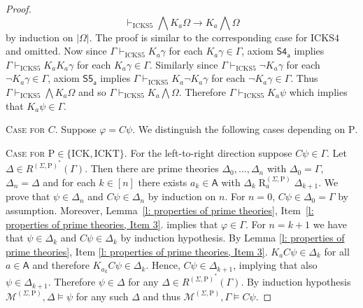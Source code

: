 \documentclass{myifcolog}
\newcommand\C {C}
\newcommand{\K}{K}
\newcommand\A{\mathsf{A}}
\newcommand{\agi}{a}
\newcommand{\fw}{\mathcal{M}}
\newcommand{\Rel}{\mathrel{R}}
\newcommand{\hick}{\mathrm{ICK}}
\newcommand{\hickt}{\mathrm{ICKT}}
\newcommand{\hicks}{\mathrm{ICKS4}}
\newcommand{\hickss}{\mathrm{ICKS5}}
\newcommand{\hickp}{\mathrm{P}}
\numberwithin{theorem}{section}
\begin{document}
\begin{proof}
\begin{equation}
     \vdash_\hickss \bigwedge \K_\agi \Omega \rightarrow \K_\agi \bigwedge \Omega
 \end{equation}
 by induction on $\lvert \Omega \rvert$. The proof is similar to the corresponding case for $\hicks$ and omitted. Now since $\Gamma \vdash_\hickss \K_\agi \gamma$ for each $\K_\agi \gamma \in \Gamma$, axiom $\mathsf{S4_\agi}$ implies $\Gamma \vdash_\hickss \K_\agi \K_\agi \gamma$ for each $\K_\agi \gamma \in \Gamma$. Similarly since $\Gamma \vdash_\hickss \neg \K_\agi \gamma$ for each $\neg \K_\agi \gamma \in \Gamma$, axiom $\mathsf{S5_\agi}$ implies $\Gamma \vdash_\hickss \K_\agi \neg \K_\agi \gamma$ for each $\neg \K_\agi \gamma \in \Gamma$. Thus $\Gamma \vdash_\hickss \bigwedge \K_\agi \Omega$ and so $\Gamma \vdash_\hickss \K_\agi \bigwedge \Omega$. Therefore $\Gamma \vdash_\hickss \K_\agi \psi$ which implies that $\K_\agi \psi \in \Gamma$.
 \smallskip
     
   \setlength{\leftskip}{0cm}  \noindent \textsc{Case for $\C$.} Suppose $\varphi = \C \psi$. We distinguish the following cases depending on $\hickp$. \smallskip

   \setlength{\leftskip}{0.5cm} \noindent \textsc{Case for $\hickp \in \{\hick, \hickt\}$.} For the left-to-right direction suppose $\C \psi \in \Gamma$. Let $\Delta \in R^{(\Sigma, \hickp)^*}(\Gamma)$. Then there are prime theories $\Delta_0, \ldots, \Delta_n$ with $\Delta_0 = \Gamma$, $ \Delta_n = \Delta$ and for each $k \in [n]$ there exists $\agi_k \in \A$ with $\Delta_k \Rel_\agi^{(\Sigma, \hickp)} \Delta_{k+1}$. We prove that $\psi \in \Delta_n$ and $\C \psi \in \Delta_n$ by induction on $n$. For $n=0$, $\C \psi \in \Delta_0 = \Gamma$ by assumption. Moreover, Lemma~\ref{l: properties of prime theories}, Item~\ref{l: properties of prime theories, Item 3}. implies that $\varphi \in \Gamma$. For $n = k+1$ we have that $\psi \in \Delta_k$ and $\C \psi \in \Delta_k$ by induction hypothesis. By Lemma \ref{l: properties of prime theories}, Item \ref{l: properties of prime theories, Item 3}. $\K_\agi \C \psi \in \Delta_k$ for all $\agi \in \A$ and therefore $\K_{\agi_k} \C \psi \in \Delta_k$. Hence, $\C \psi \in \Delta_{k+1}$, implying that also $\psi \in \Delta_{k+1}$. Therefore $\psi \in \Delta$ for any $\Delta \in R^{(\Sigma, \hickp)^*}(\Gamma)$. By induction hypothesis $\fw^{(\Sigma, \hickp)}, \Delta \models \psi$ for any such $\Delta$ and thus $\fw^{(\Sigma, \hickp)}, \Gamma \models \C \psi$. 
     

\end{proof}
\end{document}
